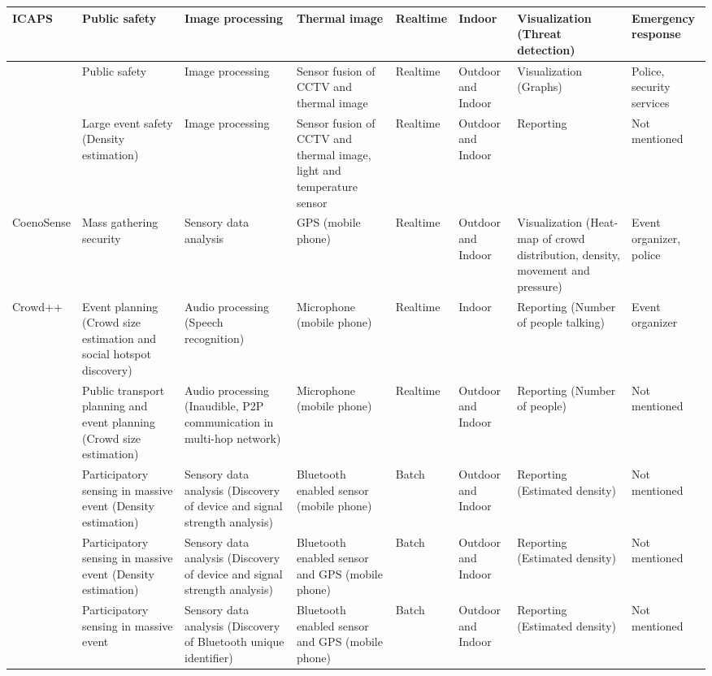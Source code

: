 \begin{center}
\begin{longtable}{|p{1.8cm}|p{2cm}|p{2cm}|p{1.8cm}|p{1.3cm}|p{1.3cm}|p{2cm}|p{1.3cm}|}
		\hline
		ICAPS \citep{Pham2007} & Public safety & Image processing & Thermal image & Realtime & Indoor & Visualization (Threat detection) & Emergency response \\
		\hline
		\citet{Andersson2009} & Public safety & Image processing & Sensor fusion of CCTV and thermal image & Realtime & Outdoor and Indoor & Visualization (Graphs) & Police, security services \\
		\hline
		\citet{Yaseen2013} & Large event safety (Density estimation) & Image processing & Sensor fusion of CCTV and thermal image, light and temperature sensor& Realtime & Outdoor and Indoor & Reporting & Not mentioned \\
		\hline
		CoenoSense \citep{Wirz2012} & Mass gathering security & Sensory data analysis & GPS (mobile phone) & Realtime & Outdoor and Indoor & Visualization (Heat-map of crowd distribution, density, movement and pressure) & Event organizer, police \\
		\hline
		Crowd++ \citep{Xu2013} & Event planning (Crowd size estimation and social hotspot discovery) & Audio processing (Speech recognition) & Microphone (mobile phone) & Realtime & Indoor & Reporting (Number of people talking) & Event organizer \\
		\hline
		\citet{Kannan2012} & Public transport planning and  event planning (Crowd size estimation) & Audio processing (Inaudible, P2P communication in multi-hop network) & Microphone (mobile phone) & Realtime & Outdoor and Indoor & Reporting (Number of people) & Not mentioned \\
		\hline
		\citet{Weppner2011} & Participatory sensing in massive event (Density estimation) & Sensory data analysis (Discovery of device and signal strength analysis) & Bluetooth enabled sensor (mobile phone) & Batch & Outdoor and Indoor & Reporting (Estimated density) & Not mentioned \\
		\hline
		\citet{Weppner2013} & Participatory sensing in massive event (Density estimation) & Sensory data analysis (Discovery of device and signal strength analysis) & Bluetooth enabled sensor and GPS (mobile phone) & Batch & Outdoor and Indoor & Reporting (Estimated density) & Not mentioned \\
		\hline
		\citet{Stopczynski2013} & Participatory sensing in massive event & Sensory data analysis (Discovery of Bluetooth unique identifier) & Bluetooth enabled sensor and GPS (mobile phone) & Batch & Outdoor and Indoor & Reporting (Estimated density) & Not mentioned \\
		\hline

\end{longtable}
\end{center}
